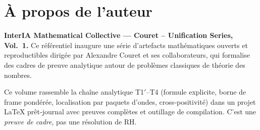 \section*{À propos de l’auteur}

\textbf{InterIA Mathematical Collective — Couret – Unification Series, Vol.~1.}
Ce référentiel inaugure une série d'artefacts mathématiques ouverts et reproductibles
dirigée par Alexandre Couret et ses collaborateurs, qui formalise
des cadres de preuve analytique autour de problèmes classiques de théorie des nombres.

\medskip

\noindent Ce volume rassemble la chaîne analytique T1$′$–T4
(formule explicite, borne de frame pondérée, localisation par paquets
d’ondes, cross‑positivité) dans un projet LaTeX prêt‑journal avec preuves
complètes et outillage de compilation. C’est une \emph{preuve de cadre},
pas une résolution de RH.
